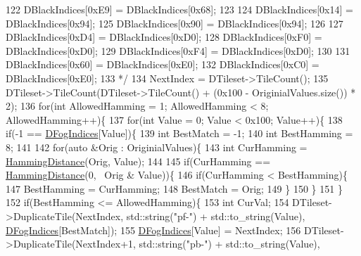 \begin{DoxyCode}
122 \textcolor{comment}{    DBlackIndices[0xE9] = DBlackIndices[0x68];}
123 \textcolor{comment}{    }
124 \textcolor{comment}{    DBlackIndices[0x14] = DBlackIndices[0x94];}
125 \textcolor{comment}{    DBlackIndices[0x90] = DBlackIndices[0x94];}
126 \textcolor{comment}{    }
127 \textcolor{comment}{    DBlackIndices[0xD4] = DBlackIndices[0xD0];}
128 \textcolor{comment}{    DBlackIndices[0xF0] = DBlackIndices[0xD0];}
129 \textcolor{comment}{    DBlackIndices[0xF4] = DBlackIndices[0xD0];}
130 \textcolor{comment}{    }
131 \textcolor{comment}{    DBlackIndices[0x60] = DBlackIndices[0xE0];}
132 \textcolor{comment}{    DBlackIndices[0xC0] = DBlackIndices[0xE0];}
133 \textcolor{comment}{    */}
134     NextIndex = DTileset->TileCount();
135     DTileset->TileCount(DTileset->TileCount() + (0x100 - OriginialValues.size()) * 2);
136     \textcolor{keywordflow}{for}(\textcolor{keywordtype}{int} AllowedHamming = 1; AllowedHamming < 8; AllowedHamming++)\{
137         \textcolor{keywordflow}{for}(\textcolor{keywordtype}{int} Value = 0; Value < 0x100; Value++)\{
138             \textcolor{keywordflow}{if}(-1 == \hyperlink{classCFogRenderer_a2028e4642e756016819aab6567800af5}{DFogIndices}[Value])\{
139                 \textcolor{keywordtype}{int} BestMatch = -1;
140                 \textcolor{keywordtype}{int} BestHamming = 8;    
141                 
142                 \textcolor{keywordflow}{for}(\textcolor{keyword}{auto} &Orig : OriginialValues)\{
143                     \textcolor{keywordtype}{int} CurHamming = \hyperlink{FogRenderer_8cpp_a0cf7f6be616e12a84cc37fd98785fd52}{HammingDistance}(Orig, Value);
144                     
145                     \textcolor{keywordflow}{if}(CurHamming == \hyperlink{FogRenderer_8cpp_a0cf7f6be616e12a84cc37fd98785fd52}{HammingDistance}(0, ~Orig & Value))\{
146                         \textcolor{keywordflow}{if}(CurHamming < BestHamming)\{
147                             BestHamming = CurHamming;
148                             BestMatch = Orig;
149                         \}
150                     \}
151                 \}
152                 \textcolor{keywordflow}{if}(BestHamming <= AllowedHamming)\{
153                     \textcolor{keywordtype}{int} CurVal;
154                     DTileset->DuplicateTile(NextIndex, std::string(\textcolor{stringliteral}{"pf-"}) + std::to\_string(Value), 
      \hyperlink{classCFogRenderer_a2028e4642e756016819aab6567800af5}{DFogIndices}[BestMatch]);
155                     \hyperlink{classCFogRenderer_a2028e4642e756016819aab6567800af5}{DFogIndices}[Value] = NextIndex;
156                     DTileset->DuplicateTile(NextIndex+1, std::string(\textcolor{stringliteral}{"pb-"}) + std::to\_string(Value), 

\end{DoxyCode}
